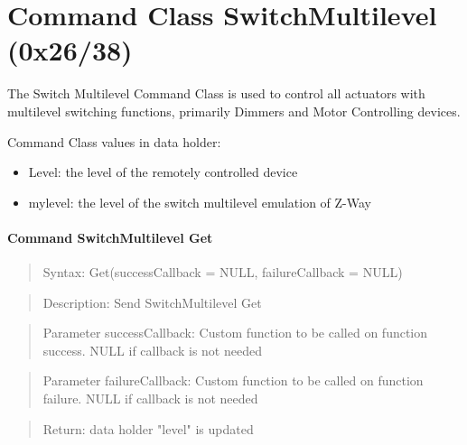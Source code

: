 \section{Command Class SwitchMultilevel (0x26/38)}

The Switch Multilevel Command Class is used to control all actuators with multilevel switching functions, primarily Dimmers and Motor Controlling devices. 

Command Class values in data holder:
\begin{itemize}
\item Level: the level of the remotely controlled device
\item mylevel:  the level of the switch multilevel emulation of Z-Way
\end{itemize}

\paragraph {Command SwitchMultilevel Get}
\begin{quote} Syntax: Get(successCallback = NULL, failureCallback = NULL)\end{quote}
\begin{quote} Description: Send SwitchMultilevel Get\end{quote}
\begin{quote} Parameter successCallback: Custom function to be called on function success. NULL if callback is not needed\end{quote}
\begin{quote} Parameter failureCallback: Custom function to be called on function failure. NULL if callback is not needed\end{quote}
\begin{quote} Return: data holder "level" is updated\end{quote}

